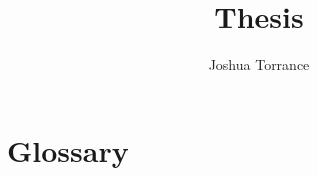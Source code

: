 \documentclass[11pt]{report}
\begin{document}
\title{Thesis}

\author{Joshua Torrance}

\maketitle






\tableofcontents






\appendix
\chapter{Glossary}
\printglossary

%
\printbibliography
\end{document}
